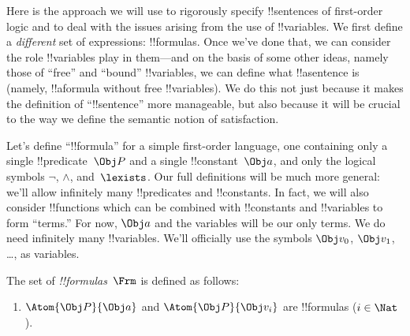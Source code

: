 \documentclass[../../../include/open-logic-section]{subfiles}
\begin{document}

Here is the approach we will use to rigorously specify !!{sentence}s
of first-order logic and to deal with the issues arising from the use
of !!{variable}s. We first define a \emph{different} set of
expressions: !!{formula}s. Once we've done that, we can consider the
role !!{variable}s play in them---and on the basis of some other
ideas, namely those of ``free'' and ``bound'' !!{variable}s, we can
define what !!a{sentence} is (namely, !!a{formula} without free
!!{variable}s). We do this not just because it makes the definition of
``!!{sentence}'' more manageable, but also because it will be crucial
to the way we define the semantic notion of satisfaction.

Let's define ``!!{formula}'' for a simple first-order language, one
containing only a single !!{predicate}~$\Obj P$ and a single
!!{constant}~$\Obj a$, and only the logical symbols $\lnot$, $\land$,
and~$\lexists$. Our full definitions will be much more general:
we'll allow infinitely many !!{predicate}s and !!{constant}s. In fact,
we will also consider !!{function}s which can be combined with
!!{constant}s and !!{variable}s to form ``terms.'' For now, $\Obj a$
and the variables will be our only terms.  We do need infinitely many
!!{variable}s.  We'll officially use the symbols $\Obj v_0$, $\Obj
v_1$, \dots, as variables.

\begin{defn}
The set of \emph{!!{formula}s}~$\Frm$ is defined as follows:
\begin{enumerate}
\item{} $\Atom{\Obj P}{\Obj a}$ and $\Atom{\Obj
  P}{\Obj v_i}$ are !!{formula}s ($i \in \Nat$).




\end{enumerate}
\end{defn}
\end{document}
